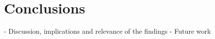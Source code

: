 \chapter{Conclusions}\label{ch:conclusions}

- Discussion, implications and relevance of the findings
- Future work